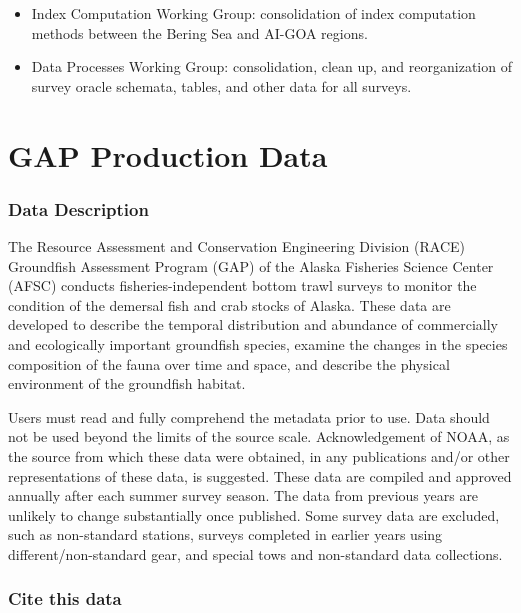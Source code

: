 \documentclass[
  letterpaper,
  oneside,
  open=any]{scrbook}
\begin{document}
\begin{itemize}
  \begin{itemize}
  \item
    Index Computation Working Group: consolidation of index computation
    methods between the Bering Sea and AI-GOA regions.
  \item
    Data Processes Working Group: consolidation, clean up, and
    reorganization of survey oracle schemata, tables, and other data for
    all surveys.
  \end{itemize}
\end{itemize}

\part{GAP Production Data}

\hypertarget{data-description}{%
\section*{Data Description}\label{data-description}}


The Resource Assessment and Conservation Engineering Division (RACE)
Groundfish Assessment Program (GAP) of the Alaska Fisheries Science
Center (AFSC) conducts fisheries-independent bottom trawl surveys to
monitor the condition of the demersal fish and crab stocks of Alaska.
These data are developed to describe the temporal distribution and
abundance of commercially and ecologically important groundfish species,
examine the changes in the species composition of the fauna over time
and space, and describe the physical environment of the groundfish
habitat.

Users must read and fully comprehend the metadata prior to use. Data
should not be used beyond the limits of the source scale.
Acknowledgement of NOAA, as the source from which these data were
obtained, in any publications and/or other representations of these
data, is suggested. These data are compiled and approved annually after
each summer survey season. The data from previous years are unlikely to
change substantially once published. Some survey data are excluded, such
as non-standard stations, surveys completed in earlier years using
different/non-standard gear, and special tows and non-standard data
collections.

\hypertarget{cite-this-data}{%
\section*{Cite this data}\label{cite-this-data}}
\end{document}
